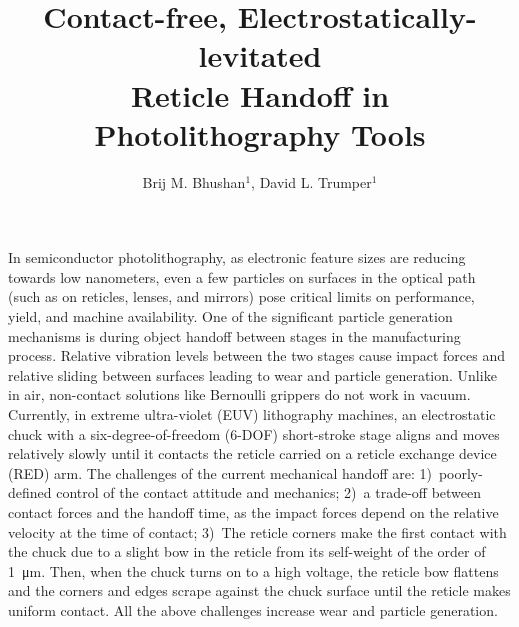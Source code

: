\documentclass[letterpaper,10pt,onecolumn]{aspe}
\title{Contact-free, Electrostatically-levitated \\Reticle Handoff in Photolithography Tools}
\author{Brij M. Bhushan$^1$, David L. Trumper$^1$}%
\begin{document}
\maketitle


In semiconductor photolithography, as electronic feature sizes are reducing towards low nanometers, even a few particles on surfaces in the optical path (such as on reticles, lenses, and mirrors) pose critical limits on performance, yield, and machine availability. One of the significant particle generation mechanisms is during object handoff between stages in the manufacturing process. Relative vibration levels between the two stages cause impact forces and relative sliding between surfaces leading to wear and particle generation. Unlike in air, non-contact solutions like Bernoulli grippers do not work in vacuum.
Currently, in extreme ultra-violet (EUV) lithography machines, an electrostatic chuck with a six-degree-of-freedom (6-DOF) short-stroke stage aligns and moves relatively slowly until it contacts the reticle carried on a reticle exchange device (RED) arm. The challenges of the current mechanical handoff are: 1)~poorly-defined control of the contact attitude and mechanics; 2)~a trade-off between contact forces and the handoff time, as the impact forces depend on the relative velocity at the time of contact;
3)~The reticle corners make the first contact with the chuck due to a slight bow in the reticle from its self-weight of the order of \SI{1}{\micro m}.
Then, when the chuck turns on to a high voltage, the reticle bow flattens and the corners and edges scrape against the chuck surface until the reticle makes uniform contact. All the above challenges increase wear and particle generation.
\end{document}
